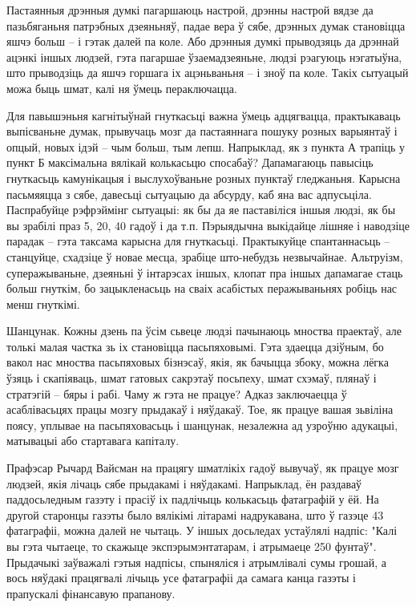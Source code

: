 Пастаянныя дрэнныя думкі пагаршаюць настрой, дрэнны настрой вядзе да пазьбяганьня патрэбных дзеяньняў, падае вера ў сябе, дрэнных думак становіцца яшчэ больш – і гэтак далей па коле. Або дрэнныя думкі прыводзяць да дрэннай ацэнкі іншых людзей, гэта пагаршае ўзаемадзеяньне, людзі рэагуюць нэгатыўна, што прыводзіць да яшчэ горшага іх ацэньваньня – і зноў па коле. Такіх сытуацый можа быць шмат, калі ня ўмець пераключацца.

Для павышэньня кагнітыўнай гнуткасьці важна ўмець адцягвацца, практыкаваць выпісваньне думак, прывучаць мозг да пастаяннага пошуку розных варыянтаў і опцый, новых ідэй – чым больш, тым лепш. Напрыклад, як з пункта А трапіць у пункт Б максімальна вялікай колькасьцю спосабаў? Дапамагаюць павысіць гнуткасьць камунікацыя і выслухоўваньне розных пунктаў гледжаньня. Карысна пасьмяяцца з сябе, давесьці сытуацыю да абсурду, каб яна вас адпусьціла. Паспрабуйце рэфрэймінг сытуацыі: як бы да яе паставіліся іншыя людзі, як бы вы зрабілі праз 5, 20, 40 гадоў і да т.п. Пэрыядычна выкідайце лішняе і наводзіце парадак – гэта таксама карысна для гнуткасьці. Практыкуйце спантаннасьць – станцуйце, схадзіце ў новае месца, зрабіце што-небудзь незвычайнае. Альтруізм, суперажываньне, дзеяньні ў інтарэсах іншых, клопат пра іншых дапамагае стаць больш гнуткім, бо зацыкленасьць на сваіх асабістых перажываньнях робіць нас менш гнуткімі.

Шанцунак. Кожны дзень па ўсім сьвеце людзі пачынаюць мноства праектаў, але толькі малая частка зь іх становіцца пасьпяховымі. Гэта здаецца дзіўным, бо вакол нас мноства пасьпяховых бізнэсаў, якія, як бачыцца збоку, можна лёгка ўзяць і скапіяваць, шмат гатовых сакрэтаў посьпеху, шмат схэмаў, плянаў і стратэгій – бяры і рабі. Чаму ж гэта не працуе? Адказ заключаецца ў асаблівасьцях працы мозгу прыдакаў і няўдакаў. Тое, як працуе вашая зьвіліна поясу, уплывае на пасьпяховасьць і шанцунак, незалежна ад узроўню адукацыі, матывацыі або стартавага капіталу. 

Прафэсар Рычард Вайсман на працягу шматлікіх гадоў вывучаў, як працуе мозг людзей, якія лічаць сябе прыдакамі і няўдакамі. Напрыклад, ён раздаваў паддосьледным газэту і прасіў іх падлічыць колькасьць фатаграфій у ёй. На другой старонцы газэты было вялікімі літарамі надрукавана, што ў газэце 43 фатаграфіі, можна далей не чытаць. У іншых досьледах устаўлялі надпіс: "Калі вы гэта чытаеце, то скажыце экспэрымэнтатарам, і атрымаеце 250 фунтаў". Прыдачыкі заўважалі гэтыя надпісы, спыняліся і атрымлівалі сумы грошай, а вось няўдакі працягвалі лічыць усе фатаграфіі да самага канца газэты і прапускалі фінансавую прапанову.

